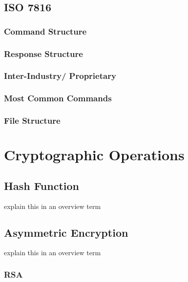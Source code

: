 \documentclass[bsc,frontabs,twoside,singlespacing,parskip,deptreport]{infthesis}     %
\begin{document}
\section{ISO 7816}

\subsection{Command Structure}
\subsection{Response Structure}
\subsection{Inter-Industry/ Proprietary}
\subsection{Most Common Commands}
\subsection{File Structure}






\chapter{Cryptographic Operations}

\section{Hash Function}

\noindent explain this in an overview term



\section{Asymmetric Encryption}

\noindent explain this in an overview term

\subsection{RSA}
\end{document}

